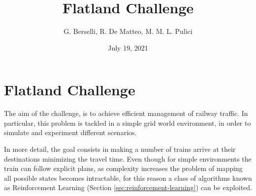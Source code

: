 \documentclass[a4paper, 12pt]{article}
\numberwithin{equation}{section}
\begin{document}
\title{Flatland Challenge}
\author{G. Berselli, R. De Matteo, M. M. L. Pulici}
\date{July 19, 2021}
\maketitle
\begin{center}
\end{center}


\clearpage

\tableofcontents

\clearpage

\listoffigures

\clearpage


\section[Flatland Challenge]{Flatland Challenge \cite{flatland}}

The aim of the challenge, is to achieve efficient management of railway traffic. In particular, this problem is tackled in a simple grid world environment, in order to simulate and experiment different scenarios.

In more detail, the goal consists in making a number of trains arrive at their destinations minimizing the travel time. Even though for simple environments the train can follow explicit plans, as complexity increases the problem of mapping all possible states becomes intractable, for this reason a class of algorithms known as Reinforcement Learning (Section \ref{sec:reinforcement-learning}) can be exploited.
\end{document}
